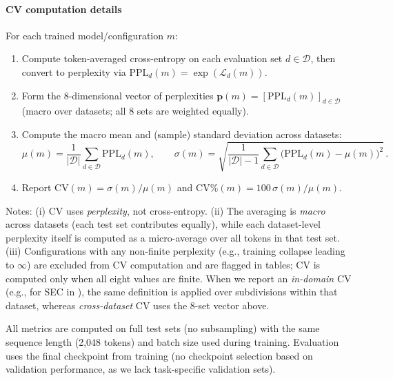 \paragraph{CV computation details}
For each trained model/configuration $m$:
\begin{enumerate}
    \item Compute token-averaged cross-entropy on each evaluation set $d\in\mathcal{D}$, then convert to perplexity via $\mathrm{PPL}_d(m) = \exp(\mathcal{L}_d(m))$.
    \item Form the 8-dimensional vector of perplexities $\mathbf{p}(m) = [\mathrm{PPL}_d(m)]_{d\in\mathcal{D}}$ (macro over datasets; all 8 sets are weighted equally).
    \item Compute the macro mean and (sample) standard deviation across datasets:
    \begin{equation*}
        \mu(m) = \frac{1}{|\mathcal{D}|}\sum_{d\in\mathcal{D}} \mathrm{PPL}_d(m),\qquad
        \sigma(m) = \sqrt{\frac{1}{|\mathcal{D}|-1}\sum_{d\in\mathcal{D}}\bigl(\mathrm{PPL}_d(m) - \mu(m)\bigr)^2} \, .
    \end{equation*}
    \item Report $\mathrm{CV}(m) = \sigma(m)/\mu(m)$ and $\mathrm{CV}\%(m) = 100\,\sigma(m)/\mu(m)$.
\end{enumerate}
Notes: (i) CV uses \emph{perplexity}, not cross-entropy. (ii) The averaging is \emph{macro} across datasets (each test set contributes equally), while each dataset-level perplexity itself is computed as a micro-average over all tokens in that test set. (iii) Configurations with any non-finite perplexity (e.g., training collapse leading to $\infty$) are excluded from CV computation and are flagged in tables; CV is computed only when all eight values are finite. When we report an \emph{in-domain} CV (e.g., for SEC in ), the same definition is applied over subdivisions within that dataset, whereas \emph{cross-dataset} CV uses the 8-set vector above.

All metrics are computed on full test sets (no subsampling) with the same sequence length (2,048 tokens) and batch size used during training. Evaluation uses the final checkpoint from training (no checkpoint selection based on validation performance, as we lack task-specific validation sets).
